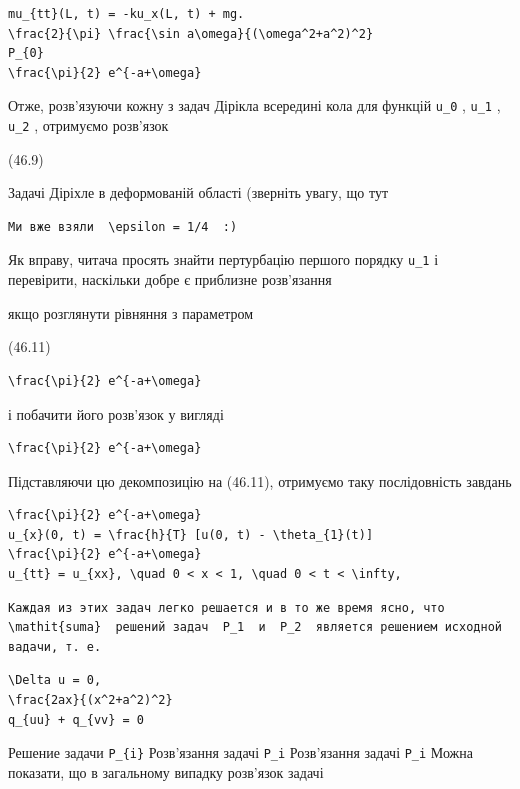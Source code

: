 \documentclass[
  ukrainian,
]{article}
\begin{document}
\begin{verbatim}
mu_{tt}(L, t) = -ku_x(L, t) + mg.
\frac{2}{\pi} \frac{\sin a\omega}{(\omega^2+a^2)^2}
P_{0}
\frac{\pi}{2} e^{-a+\omega}
\end{verbatim}

Отже, розв'язуючи кожну з задач Дірікла всередині кола для функцій
\texttt{u\_0} , \texttt{u\_1} , \texttt{u\_2} , отримуємо розв'язок

(46.9)

Задачі Діріхле в деформованій області (зверніть увагу, що тут

\begin{verbatim}
Ми вже взяли  \epsilon = 1/4  :)
\end{verbatim}

Як вправу, читача просять знайти пертурбацію першого порядку
\texttt{u\_1} і перевірити, наскільки добре є приблизне розв'язання

якщо розглянути рівняння з параметром

(46.11)

\begin{verbatim}
\frac{\pi}{2} e^{-a+\omega}
\end{verbatim}

і побачити його розв'язок у вигляді

\begin{verbatim}
\frac{\pi}{2} e^{-a+\omega}
\end{verbatim}

Підставляючи цю декомпозицію на (46.11), отримуємо таку послідовність
завдань

\begin{verbatim}
\frac{\pi}{2} e^{-a+\omega}
u_{x}(0, t) = \frac{h}{T} [u(0, t) - \theta_{1}(t)]
\frac{\pi}{2} e^{-a+\omega}
u_{tt} = u_{xx}, \quad 0 < x < 1, \quad 0 < t < \infty,
\end{verbatim}

\begin{verbatim}
Каждая из этих задач легко решается и в то же время ясно, что  \mathit{suma}  решений задач  P_1  и  P_2  является решением исходной вадачи, т. е.
\end{verbatim}

\begin{verbatim}
\Delta u = 0,
\frac{2ax}{(x^2+a^2)^2}
q_{uu} + q_{vv} = 0
\end{verbatim}

Решение задачи \texttt{P\_\{i\}} Розв'язання задачі \texttt{P\_i}
Розв'язання задачі \texttt{P\_i} Можна показати, що в загальному випадку
розв'язок задачі
\end{document}
